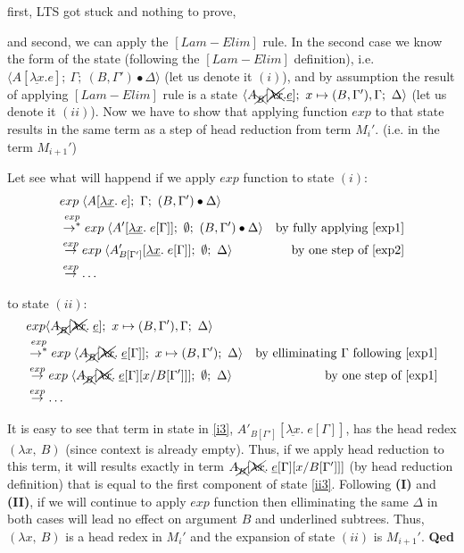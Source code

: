 \documentclass[a4paper, 10pt]{article}
\begin{document}
first, LTS got stuck and nothing to prove,

and second, we can apply the $[Lam-Elim]$ rule. In the second case we know the form of the state (following the $[Lam-Elim]$ definition), i.e. $\langle A[\underline{\lambda x}. e];\ \Gamma;\ (B,\Gamma')\bullet\Delta \rangle$ (let us denote it $(i)$), and by assumption the result of applying $[Lam-Elim]$ rule is a state $\langle A_{\xcancel{B}}[\xcancel{\lambda x}.\underline{e}];\ x \mapsto (B,\Gamma'),\Gamma;\ \Delta \rangle$ (let us denote it $(ii)$). Now we have to show that applying function $exp$ to that state results in the same term as a step of head reduction from term $M_i'$. (i.e. in the term $M_{i+1}'$)

Let see what will happend if we apply $exp$ function to state $(i)$:
\begin{align}
  &exp\; \langle A[\underline{\lambda x}.\; e];\ \Gamma;\ (B,\Gamma')\bullet\Delta \rangle & \\
  &\overset{exp}{\rightarrow^{*}}
  exp\; \langle A'[\underline{\lambda x}.\; e[\Gamma]];\ \emptyset;\ (B,\Gamma')\bullet\Delta \rangle &\textnormal{by fully applying \eqref{exp1}} \\
  \label{i3} &\overset{exp}{\rightarrow}
  exp\; \langle A'_{B[\Gamma']}[\underline{\lambda x}.\; e[\Gamma]];\ \emptyset;\ \Delta \rangle &\textnormal{by one step of \eqref{exp2}} \\
  &\overset{exp}{\rightarrow}
  \dots &
\end{align}

to state $(ii)$:
\begin{align}
  &exp \langle A_{\xcancel{B}}[\xcancel{\lambda x}.\; \underline{e}];\ x \mapsto (B,\Gamma'),\Gamma;\ \Delta \rangle & \\
  &\overset{exp}{\rightarrow^{*}}
  exp\;\langle A_{\xcancel{B}}[\xcancel{\lambda x}.\; \underline{e}[\Gamma]];\ x \mapsto (B,\Gamma');\ \Delta \rangle &\textnormal{by elliminating $\Gamma$ following \eqref{exp1}} \\
  \label{ii3} &\overset{exp}{\rightarrow}
  exp\; \langle A_{\xcancel{B}}[\xcancel{\lambda x}.\; \underline{e}[\Gamma][x/B[\Gamma']]];\ \emptyset;\ \Delta \rangle &\textnormal{by one step of \eqref{exp1}} \\
  &\overset{exp}{\rightarrow}
  \dots &
\end{align}

It is easy to see that term in state in \eqref{i3}, $A'_{B[\Gamma']}[\underline{\lambda x}.\; e[\Gamma]]$, has the head redex $(\lambda x,\ B)$ (since context is already empty). Thus, if we apply head reduction to this term, it will results exactly in term $A_{\xcancel{B}}[\xcancel{\lambda x}.\; \underline{e}[\Gamma][x/B[\Gamma']]]$ (by head reduction definition) that is equal to the first component of state \eqref{ii3}. Following \textbf{(I)} and \textbf{(II)}, if we will continue to apply $exp$ function then elliminating the same $\Delta$ in both cases will lead no effect on argument $B$ and underlined subtrees. Thus, $(\lambda x,\ B)$ is a head redex in $M_i'$ and the expansion of state $(ii)$ is $M_{i+1}'$. \hfill{\textbf{Qed}} \\ \\ 
\end{document}
